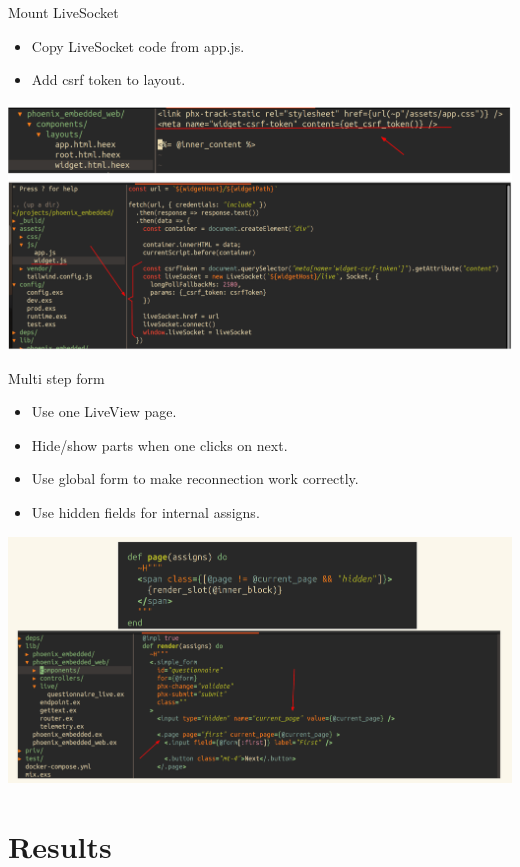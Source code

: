 \documentclass{beamer}
\begin{document}
\begin{frame}{Mount LiveSocket}
\begin{itemize}
  \item Copy LiveSocket code from app.js.
  \item Add csrf token to layout.
\end{itemize}
\centering
\includegraphics[width=0.8\linewidth]{images/mount-socket.png}
\end{frame}

\begin{frame}{Multi step form}
\begin{itemize}
  \item Use one LiveView page.
  \item Hide/show parts when one clicks on next.
  \item Use global form to make reconnection work correctly.
  \item Use hidden fields for internal assigns.
\end{itemize}
\centering
\includegraphics[width=0.8\linewidth]{images/multi-step-form.png}
\end{frame}

\section{Results}
\end{document}
